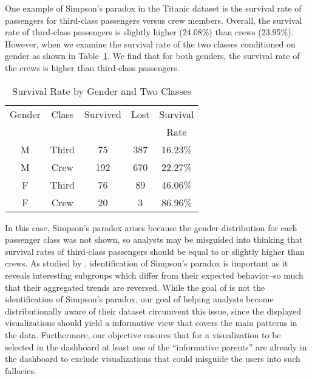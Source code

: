 \npar One example of Simpson's paradox in the Titanic dataset is the survival rate of passengers for third-class passengers versus crew members. Overall, the survival rate of third-class passengers is slightly higher (24.08\%) than crews (23.95\%). However, when we examine the survival rate of the two classes conditioned on gender as shown in Table~\ref{tab:t2}. We find that for both genders, the survival rate of the crews is higher than third-class passengers.

\begin{table}[thb]
	\begin{center}
	\begin{tabular}{ccccc}
	\toprule
	Gender & Class & Survived & Lost & Survival\\
	& & & & Rate\\
	\midrule
	M & Third & 75 & 387 & 16.23\%\\
	M & Crew & 192 & 670 & 22.27\%\\
	\bottomrule
    F & Third & 76 & 89 & 46.06\%\\
	F & Crew & 20 & 3 & 86.96\%\\
	\bottomrule
	\end{tabular}
    \end{center}
	\caption{Survival Rate by Gender and Two Classes}
    \label{tab:t2}
\end{table}

In this case, Simpson's paradox arises because the gender distribution for each passenger class was not shown, so analysts may be misguided into thinking that survival rates of third-class passengers should be equal to or slightly higher than crews. As studied by \cite{Alipourfard2018,Guo2017}, identification of Simpson's paradox is important as it reveals interesting subgroups which differ from their expected behavior--so much that their aggregated trends are reversed. While the goal of \system is not the identification of Simpson's paradox, our goal of helping analysts become distributionally aware of their dataset circumvent this issue, since the displayed visualizations should yield a informative view that covers the main patterns in the data. Furthermore, our objective ensures that for a visualization to be selected in the dashboard at least one of the ``informative parents'' are already in the dashboard to exclude visualizations that could misguide the users into such fallacies.

